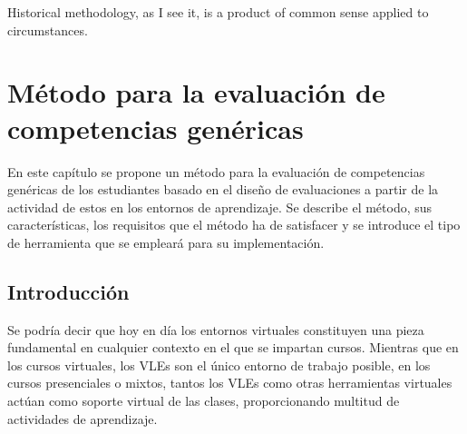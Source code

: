 

\begin{savequote}[50mm]
Historical methodology, as I see it, is a product of common sense applied to circumstances. 
\end{savequote}


\chapter{Método para la evaluación de competencias genéricas}
\label{cha:Overall methodology}

\ifpdf
    \graphicspath{{4_overall_methodology/figures/PNG/}{4_overall_methodology/figures/PDF/}{4_overall_methodology/figures/}}
\else
    \graphicspath{{4_overall_methodology/figures/EPS/}{4_overall_methodology/figures/}}
\fi


En este capítulo se propone un método para la evaluación de competencias genéricas de los estudiantes basado en el diseño de evaluaciones a partir de la actividad de estos en los entornos de aprendizaje. Se describe el método, sus características, los requisitos que el método ha de satisfacer y se introduce el tipo de herramienta que se empleará para su implementación.

\section{Introducción}

Se podría decir que hoy en día los entornos virtuales constituyen una pieza fundamental en cualquier contexto en el que se impartan cursos. Mientras que en los cursos virtuales, los VLEs son el único entorno de trabajo posible, en los cursos presenciales o mixtos, tantos los VLEs como otras herramientas virtuales actúan como soporte virtual de las clases, proporcionando multitud de actividades de aprendizaje. 

